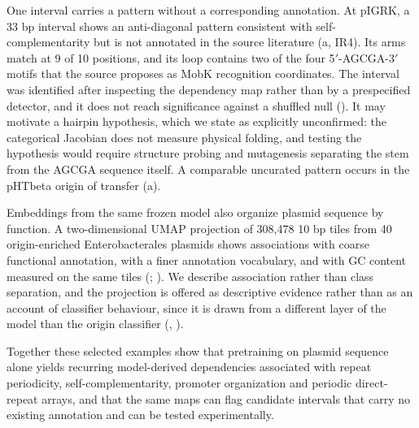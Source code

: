 One interval carries a pattern without a corresponding annotation. At pIGRK,
a 33 bp interval shows an anti-diagonal pattern consistent with
self-complementarity but is not annotated in the source literature
(a, IR4). Its arms match at 9 of 10 positions, and
its loop contains two of the four 5$'$-AGCGA-3$'$ motifs that the source
proposes as MobK recognition coordinates. The interval was identified after
inspecting the dependency map rather than by a prespecified detector, and it
does not reach significance against a shuffled null ().
It may motivate a hairpin hypothesis, which we state as explicitly
unconfirmed: the categorical Jacobian does not measure physical folding, and
testing the hypothesis would require structure probing and mutagenesis
separating the stem from the AGCGA sequence itself. A comparable uncurated
pattern occurs in the pHTbeta origin of transfer
(a).

Embeddings from the same frozen model also organize plasmid sequence by
function. A two-dimensional UMAP \cite{mcinnes2018umap} projection of 308,478 10 bp tiles from 40 origin-enriched Enterobacterales
plasmids shows associations with coarse functional annotation, with a finer
annotation vocabulary, and with GC content measured on the same tiles
(;
). We describe association
rather than class separation, and the projection is offered as descriptive
evidence rather than as an account of classifier behaviour, since it is drawn
from a different layer of the model than the origin classifier
(, ).

Together these selected examples show that pretraining on plasmid sequence
alone yields recurring model-derived dependencies associated with repeat
periodicity, self-complementarity, promoter organization and periodic
direct-repeat arrays, and that the same maps can flag candidate intervals
that carry no existing annotation and can be tested experimentally.
